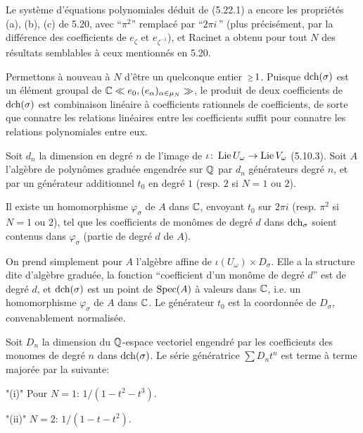 Le syst\`eme d'\'equations polynomiales
d\'eduit de (5.22.1) a encore les
propri\'et\'es (a), (b), (c) de 5.20, avec
``$\pi^2$'' remplac\'e par ``$2\pi i\,$'' (plus
pr\'ecis\'ement, par la diff\'erence des
coefficients de $e_\zeta$ et
$e_{\zeta^{-1}}$), et Racinet a obtenu 
pour tout $N$ des r\'esultats semblables \`a ceux
mentionn\'es en 5.20.

\endsubhead
Permettons \`a nouveau \`a $N$ d'\^{e}tre un
quelconque entier $\Ge 1$.
Puisque $\text{\rm dch}(\sigma)$ est un \'el\'ement
groupal de
${\Bbb C}\ll e_0,(e_\alpha)_{\alpha\in\mu_N}\gg$, le
produit de deux coefficients de $\text{\rm dch}(\sigma)$
est combinaison lin\'eaire \`a coefficients
rationnels de coefficients, de sorte que
conna{\hati}tre les relations lin\'eaires entre les
coefficients suffit pour conna{\hati}tre  les
relations polynomiales entre eux.

Soit $d_n$ la dimension en degr\'e $n$ de
l'image de $\iota\colon\,\text{\rm Lie}\,U_\omega\to
\text{\rm Lie}\,V_\omega$ (5.10.3).
Soit $A$ l'alg\`ebre de polyn\^{o}mes
gradu\'ee engendr\'ee sur ${\Bbb Q}$ par $d_n$
g\'en\'erateurs degr\'e $n$, et par un
g\'en\'erateur additionnel $t_0$ en degr\'e
$1$ (resp. $2$ si $N=1$ ou $2$).

Il existe un homomorphisme $\varphi_\sigma$ de
$A$ dans ${\Bbb C}$, envoyant $t_0$ sur $2\pi i$
(resp. $\pi^2$ si $N=1$ ou $2$), tel que les
coefficients de mon\^{o}mes de degr\'e $d$
dans $\text{\rm dch}_\sigma$ soient contenus
dans\break
 $\varphi_\sigma$ (partie de degr\'e $d$ de $A$).
\endproclaim

On prend simplement pour $A$ l'alg\`ebre
affine de $\iota(U_\omega)\times D_\sigma$.
Elle a la structure dite d'alg\`ebre
gradu\'ee, la fonction ``coefficient d'un
mon\^{o}me de degr\'e $d$'' est de degr\'e
$d$, et $\text{\rm dch}(\sigma)$ est un point de
$\text{\rm Spec}(A)$ \`a valeurs dans ${\Bbb C}$, i.e. un
homomorphisme $\varphi_\sigma$ de $A$ dans
${\Bbb C}$.
Le g\'en\'erateur $t_0$ est la coordonn\'ee de
$D_\sigma$, convenablement normalis\'ee.
\enddemo

Soit $D_n$ la dimension du ${\Bbb Q}$-espace
vectoriel engendr\'e par les coefficients des
monomes de degr\'e $n$ dans $\text{\rm dch}(\sigma)$.
Le s\'erie g\'en\'eratrice $\sum D_nt^n$ est
terme \`a terme major\'ee par la suivante:

\roster
\item"{\sans (i)}"
Pour $N=1$: $1/(1-t^2-t^3)$.

\item"{\sans (ii)}"
$N=2$: $1/(1-t-t^2)$.

